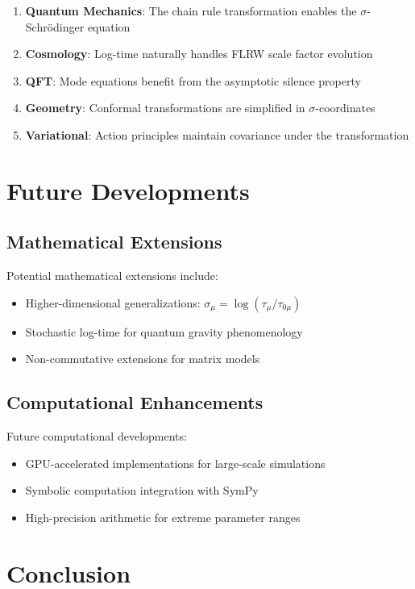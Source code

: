 \documentclass[11pt,a4paper]{article}
\begin{document}
\begin{enumerate}
\item \textbf{Quantum Mechanics}: The chain rule transformation enables the $\sigma$-Schrödinger equation
\item \textbf{Cosmology}: Log-time naturally handles FLRW scale factor evolution
\item \textbf{QFT}: Mode equations benefit from the asymptotic silence property
\item \textbf{Geometry}: Conformal transformations are simplified in $\sigma$-coordinates
\item \textbf{Variational}: Action principles maintain covariance under the transformation
\end{enumerate}

\section{Future Developments}

\subsection{Mathematical Extensions}

Potential mathematical extensions include:

\begin{itemize}
\item Higher-dimensional generalizations: $\sigma_\mu = \log(\tau_\mu/\tau_{0\mu})$
\item Stochastic log-time for quantum gravity phenomenology
\item Non-commutative extensions for matrix models
\end{itemize}

\subsection{Computational Enhancements}

Future computational developments:

\begin{itemize}
\item GPU-accelerated implementations for large-scale simulations
\item Symbolic computation integration with SymPy
\item High-precision arithmetic for extreme parameter ranges
\end{itemize}

\section{Conclusion}
\end{document}
